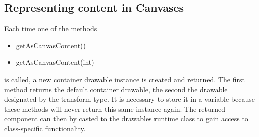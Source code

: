 \documentclass[a4paper,12pt]{book}
\begin{document}
  \subsection{Representing content in Canvases}
    Each time one of the methods
     \begin{itemize}
      \item getAsCanvasContent()
      \item getAsCanvasContent(int)
    \end{itemize}
    is called, a new container drawable instance is created and returned. The first
    method returns the default container drawable, the second the drawable designated
    by the transform type. It is necessary to store it in a variable because these
    methods will never return this same instance again. The returned component can
    then by casted to the drawables runtime class to gain access to class-specific 
    functionality.
    
\end{document}

